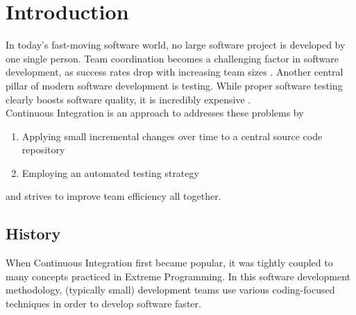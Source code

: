 \section{Introduction}\label{sec:introduction}

In today's fast-moving software world, no large software project is developed by
one single person. Team coordination becomes a challenging factor in software
development, as success rates drop with increasing team sizes
\cite{ambler:2010}. Another central pillar of modern software development is
testing. While proper software testing clearly boosts software quality, it is
incredibly expensive \cite{dustin:1999}.\\

Continuous Integration is an approach to addresses these problems by
\begin{enumerate}[label=(\alph*)]
    \item Applying small incremental changes over time to a central source code
       repository
    \item Employing an automated testing strategy
\end{enumerate}

and strives to improve team efficiency all together.

\subsection{History}\label{sec:history}

When Continuous Integration first became popular, it was tightly coupled to many
concepts practiced in Extreme Programming. In this software development
methodology, (typically small) development teams use various coding-focused
techniques in order to develop software faster.

